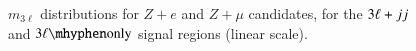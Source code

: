 \begin{figure}[h]
{  }
  \caption{$m_{3\ell}$ distributions for $Z+e$ and $Z+\mu$ candidates, for the $3\ell+jj$ and $\threelo$ signal regions (linear scale).}
  \label{fig:SR-m3l-2-linear}
\end{figure}


